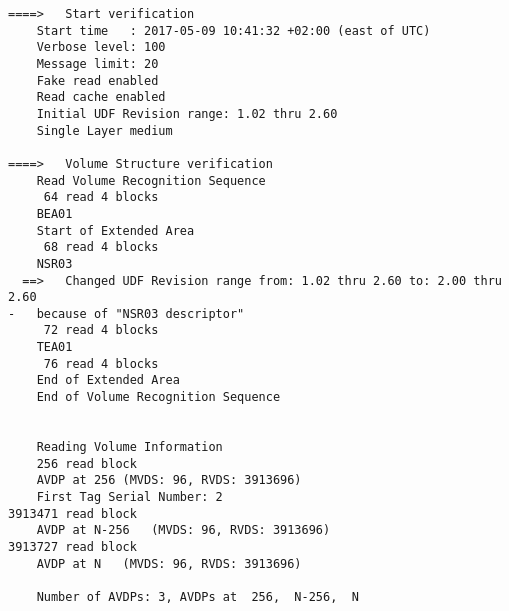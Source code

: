 \begin{lstlisting}
====>   Start verification
    Start time   : 2017-05-09 10:41:32 +02:00 (east of UTC)
    Verbose level: 100
    Message limit: 20
    Fake read enabled
    Read cache enabled
    Initial UDF Revision range: 1.02 thru 2.60
    Single Layer medium

====>   Volume Structure verification
    Read Volume Recognition Sequence
     64 read 4 blocks
    BEA01
    Start of Extended Area
     68 read 4 blocks
    NSR03
  ==>   Changed UDF Revision range from: 1.02 thru 2.60 to: 2.00 thru 2.60
-   because of "NSR03 descriptor"
     72 read 4 blocks
    TEA01
     76 read 4 blocks
    End of Extended Area
    End of Volume Recognition Sequence


    Reading Volume Information
    256 read block
    AVDP at 256 (MVDS: 96, RVDS: 3913696)
    First Tag Serial Number: 2
3913471 read block
    AVDP at N-256   (MVDS: 96, RVDS: 3913696)
3913727 read block
    AVDP at N   (MVDS: 96, RVDS: 3913696)

    Number of AVDPs: 3, AVDPs at  256,  N-256,  N


\end{lstlisting}
